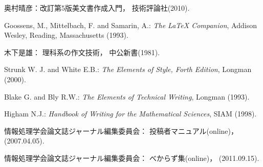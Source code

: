 \documentclass[submit,techrep,noauthor]{ipsj}
\begin{document}
\begin{thebibliography}{10}

奥村晴彦：改訂第5版\LaTeXe 美文書作成入門，
技術評論社(2010).

Goossens, M., Mittelbach, F. and Samarin, A.:
{\it The LaTeX Companion},
Addison Wesley, Reading, Massachusetts (1993).

木下是雄：
理科系の作文技術，
中公新書(1981).

Strunk W. J. and White E.B.:
{\it The Elements of Style, Forth Edition},
Longman (2000).

Blake G. and Bly R.W.:
{\it The Elements of Technical Writing},
Longman (1993).

Higham N.J.:
{\it Handbook of Writing for the Mathematical Sciences},
SIAM (1998).

情報処理学会論文誌ジャーナル編集委員会：
投稿者マニュアル(online)，
(2007.04.05).

情報処理学会論文誌ジャーナル編集委員会：
べからず集(online)，
(2011.09.15).

\end{thebibliography}
\end{document}
